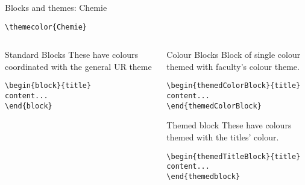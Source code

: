 \begingroup
{}
\begin{frame}[fragile]{Blocks and themes: Chemie}
    \begin{center}\verb|\themecolor{Chemie}|\end{center}
\begin{columns} %
\begin{column}{0.3\textwidth}
\begin{block}{Standard Blocks}
These have colours coordinated with the general UR theme
\begin{verbatim}
\begin{block}{title}
content...
\end{block}
\end{verbatim}
\end{block}
\end{column}
\begin{column}{0.7\textwidth}
\begin{themedColorBlock}{Colour Blocks}
Block of single colour themed with faculty's colour theme.
\small
\begin{verbatim}
\begin{themedColorBlock}{title}
content...
\end{themedColorBlock}
\end{verbatim}
\end{themedColorBlock}
\begin{themedTitleBlock} {Themed block}
These have colours themed with the titles' colour.
\small
\begin{verbatim}
\begin{themedTitleBlock}{title}
content...
\end{themedblock}
\end{verbatim}
\end{themedTitleBlock}
\end{column}
\end{columns}
\end{frame}
\endgroup



